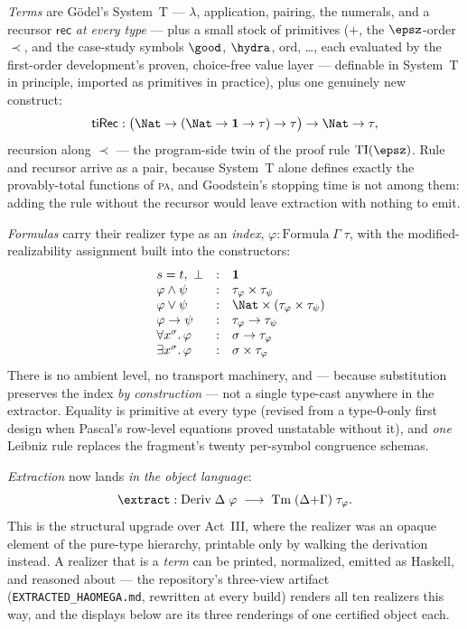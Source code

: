 \emph{Terms} are G\"odel's System~T --- $\lambda$, application, pairing, the
numerals, and a recursor $\mathsf{rec}$ \emph{at every type} --- plus a small
stock of primitives ($+$, the $\epsz$-order $\prec$, and the case-study
symbols $\good$, $\hydra$, $\mathrm{ord}$, \dots, each evaluated by the
first-order development's proven, choice-free value layer --- definable in
System~T in principle, imported as primitives in practice), plus one
genuinely new construct:
\[
  \mathsf{tiRec} : \bigl(\Nat \to (\Nat \to \mathbf{1} \to \tau) \to
  \tau\bigr) \to \Nat \to \tau ,
\]
recursion along $\prec$ --- the program-side twin of the proof rule
$\mathrm{TI}(\epsz)$. Rule and recursor arrive as a pair, because System~T
alone defines exactly the provably-total functions of \textsc{pa}, and
Goodstein's stopping time is not among them: adding the rule without the
recursor would leave extraction with nothing to emit.

\emph{Formulas} carry their realizer type as an \emph{index},
$\varphi : \mathrm{Formula}\;\Gamma\;\tau$, with the modified-realizability
assignment built into the constructors:
\[
\begin{array}{llcl}
  & s = t,\ \bot &:& \mathbf{1}\\
  & \varphi \land \psi &:& \tau_\varphi \times \tau_\psi\\
  & \varphi \lor \psi &:& \Nat \times (\tau_\varphi \times \tau_\psi)\\
  & \varphi \to \psi &:& \tau_\varphi \to \tau_\psi\\
  & \forall x^{\sigma}.\,\varphi &:& \sigma \to \tau_\varphi\\
  & \exists x^{\sigma}.\,\varphi &:& \sigma \times \tau_\varphi
\end{array}
\]
There is no ambient level, no transport machinery, and --- because
substitution preserves the index \emph{by construction} --- not a single
type-cast anywhere in the extractor. Equality is primitive at every type
(revised from a type-$0$-only first design when Pascal's row-level equations
proved unstatable without it), and \emph{one} Leibniz rule replaces the
fragment's twenty per-symbol congruence schemas.

\emph{Extraction} now lands \emph{in the object language}:
\[
  \extract : \mathrm{Deriv}\;\Delta\;\varphi \;\longrightarrow\;
  \mathrm{Tm}\;(\Delta{+}\Gamma)\;\tau_\varphi .
\]
This is the structural upgrade over Act~III, where the realizer was an
opaque element of the pure-type hierarchy, printable only by walking the
derivation instead. A realizer that is a \emph{term} can be printed,
normalized, emitted as Haskell, and reasoned about --- the repository's
three-view artifact (\texttt{EXTRACTED\_HAOMEGA.md}, rewritten at every
build) renders all ten realizers this way, and the displays below are its
three renderings of one certified object each.

